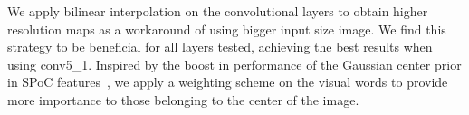 \documentclass{sig-arxiv}
\begin{document}
We apply bilinear interpolation on the convolutional layers to obtain higher resolution maps as a workaround of using bigger input size image. We find this strategy to be beneficial for all layers tested, achieving the best results when using conv5\_1. Inspired by the boost in performance of the Gaussian center prior in SPoC features~\cite{babenko2015}, we apply a weighting scheme on the visual words to provide more importance to those belonging to the center of the image. 
\end{document}
